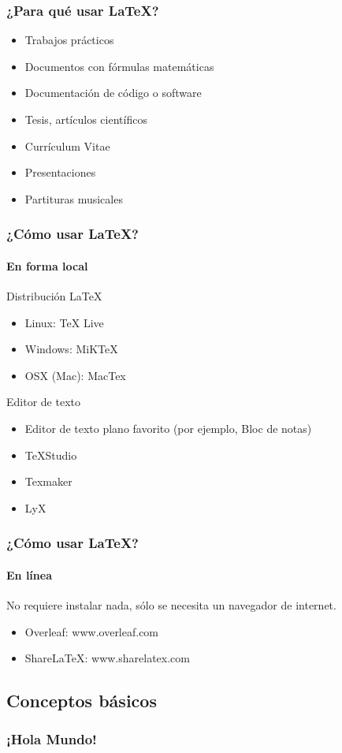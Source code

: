 \documentclass[svgnames]{beamer}
\begin{document}
\begin{frame}
  \frametitle{¿Para qué usar \LaTeX?}
  \begin{itemize}
    \item Trabajos prácticos
    \item Documentos con fórmulas matemáticas
    \item Documentación de código o software
    \item Tesis, artículos científicos
    \item Currículum Vitae
    \item Presentaciones
    \item Partituras musicales
  \end{itemize}
\end{frame}

\begin{frame}
  \frametitle{¿Cómo usar \LaTeX?}
  \framesubtitle{En forma local}
  Distribución \LaTeX
  \begin{itemize}
    \item Linux: TeX Live
    \item Windows: MiKTeX
    \item OSX (Mac): MacTex
  \end{itemize}

  \vfill

  Editor de texto
  \begin{itemize}
    \item Editor de texto plano favorito (por ejemplo, Bloc de notas)
    \item TeXStudio
    \item Texmaker
    \item LyX
  \end{itemize}
\end{frame}

\begin{frame}
  \frametitle{¿Cómo usar \LaTeX?}
  \framesubtitle{En línea}
  No requiere instalar nada, sólo se necesita un navegador de internet.
  \begin{itemize}
    \item Overleaf: www.overleaf.com
    \item ShareLaTeX: www.sharelatex.com
  \end{itemize}
\end{frame}

\subsection{Conceptos básicos}
\begin{frame}
  \frametitle{¡Hola Mundo!}
  
\end{frame}
\end{document}
